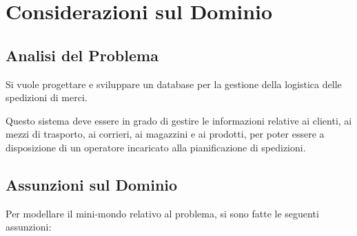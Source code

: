 \chapter{Considerazioni sul Dominio}

\section{Analisi del Problema}

Si vuole progettare e sviluppare un database per la gestione della logistica delle spedizioni di merci.

Questo sistema deve essere in grado di gestire le informazioni relative ai clienti, ai mezzi di trasporto, ai corrieri, ai magazzini e ai prodotti, per poter essere a disposizione di un operatore incaricato alla pianificazione di spedizioni.

\section{Assunzioni sul Dominio} 

Per modellare il mini-mondo relativo al problema, si sono fatte le seguenti assunzioni:

